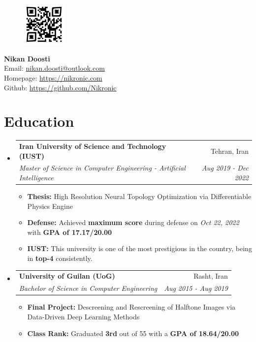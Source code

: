 \documentclass[letterpaper,11pt]{article}
\makeatletter
\newcommand{\resumeItem}[1]{
  \item\small{
    {#1 \vspace{0pt}}
  }
}
\newcommand{\resumeSubheadingF}[4]{
  \item
    \begin{tabular*}{0.97\textwidth}{l@{\extracolsep{\fill}}r}
      \textbf{#1} & #2 \\ 
      \textit{\small#3} & \textit{\small #4} \\
    \end{tabular*}\vspace{-5pt}
}
\newcommand{\resumeSubHeadingListStart}{\begin{itemize}[leftmargin=*]}
\newcommand{\resumeSubHeadingListEnd}{\end{itemize}}
\newcommand{\resumeItemListStart}{\begin{itemize}}
\newcommand{\resumeItemListEnd}{\end{itemize}\vspace{-5pt}}
\makeatother
\begin{document}
\begin{figure} %
  \vspace{-\baselineskip} %
  \includegraphics[width=2.2cm, height=2.2cm]{qrcode.png}
\end{figure}

\textbf{{\Large Nikan Doosti}} \\
Email: \href{mailto:nikan.doosti@outlook.com}{nikan.doosti@outlook.com}\\
Homepage: \href{https://nikronic.com/}{https://nikronic.com}\\
Github: \href{https://github.com/Nikronic}{https://github.com/Nikronic}

\hspace{0cm} %
\section{Education}
 \resumeSubHeadingListStart
   \resumeSubheadingF
     {Iran University of Science and Technology (IUST)}{Tehran, Iran}
     {Master of Science in Computer Engineering - Artificial Intelligence}{Aug 2019 - Dec 2022}
      \resumeItemListStart
        \resumeItem{\textbf{Thesis:} High Resolution Neural Topology Optimization via Differentiable Physics Engine}
        \resumeItem{\textbf{Defense:} Achieved \textbf{maximum score} during defense on \textit{Oct 22, 2022} with \textbf{GPA of 17.17/20.00}}
        \resumeItem{\textbf{IUST:} This university is one of the most prestigious in the country, being in \textbf{top-4} consistently.}
      \resumeItemListEnd
   \resumeSubheadingF
     {University of Guilan (UoG)}{Rasht, Iran}
     {Bachelor of Science in Computer Engineering}{Aug 2015 - Aug 2019}
     \resumeItemListStart
        \resumeItem{\textbf{Final Project:} Descreening and Rescreening of Halftone Images via Data-Driven Deep Learning Methods}
        \resumeItem{\textbf{Class Rank:} Graduated \textbf{3rd} out of 55 with a \textbf{GPA of 18.64/20.00}}
      \resumeItemListEnd
 \resumeSubHeadingListEnd
\end{document}
